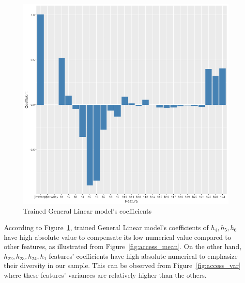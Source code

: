 \documentclass[English]{dicomopapers}
\begin{document}
\begin{figure}[ht]
  \vspace*{-2.5cm}
  \centering
  \includegraphics[width=\columnwidth,natwidth=827,natheight=805]{glm_coef.png}
  \caption{Trained General Linear model's coefficients}\label{fig:glm_coef}
\end{figure}
 According to Figure~\ref{fig:glm_coef}, trained General Linear model's coefficients of \(h_4, h_5, h_6\) have high absolute value to compensate its low numerical value compared to other features, as illustrated from Figure~\ref{fig:access_mean}. On the other hand, \(h_{22}, h_{23}, h_{24}, h_1\) features' coefficients have high absolute numerical to emphasize their diversity in our sample. This can be observed from Figure~\ref{fig:access_var} where these features' variances are relatively higher than the others.\newline
\end{document}
